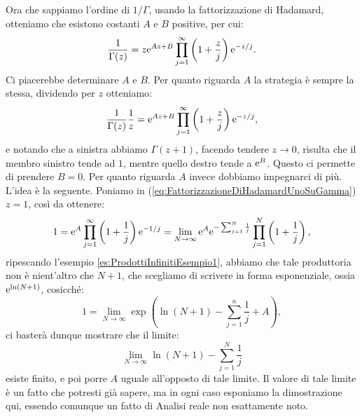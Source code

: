 \documentclass[11pt]{book}
\theoremstyle{Definizione}
\theoremstyle{TeoremaProposizioneLemmaCorollarioCongettura}
\theoremstyle{OsservazioneNotaEsempio}
\newcommand{\e}{\textup{e}}
\begin{document}
Ora che sappiamo l'ordine di $1/\Gamma$, usando la fattorizzazione di Hadamard, otteniamo che esistono costanti $A$ e $B$ positive, per cui:
\begin{equation}\label{eq:FattorizzazioneDiHadamardUnoSuGamma}
\frac{1}{\Gamma(z)} = z \e^{Az+B} \prod_{j = 1}^\infty \left(1+\frac{z}{j}\right)\e^{-z/j}.
\end{equation}
Ci piacerebbe determinare $A$ e $B$. Per quanto riguarda $A$ la strategia è sempre la stessa, dividendo per $z$ otteniamo:
$$
\frac{1}{\Gamma(z)}\frac{1}{z} = \e^{Az+B} \prod_{j = 1}^\infty \left(1+\frac{z}{j}\right)\e^{-z/j},
$$
e notando che a sinistra abbiamo $\Gamma(z+1)$, facendo tendere $z \to 0$, risulta che il membro sinistro tende ad $1$, mentre quello destro tende a $\e^{B}$. Questo ci permette di prendere $B = 0$. Per quanto riguarda $A$ invece dobbiamo impegnarci di più. L'idea è la seguente. Poniamo in (\ref{eq:FattorizzazioneDiHadamardUnoSuGamma}) $z = 1$, così da ottenere:
$$
1 = \e^{A} \prod_{j = 1}^\infty \left(1+\frac{1}{j}\right)\e^{-1/j}  = \lim_{N \to \infty} \e^{A} \e^{-\sum_{j = 1}^N \frac{1}{j}} \prod_{j = 1}^N \left(1+\frac{1}{j}\right),
$$
ripescando l'esempio \ref{es:ProdottiInfinitiEsempio1}, abbiamo che tale produttoria non è nient'altro che $N+1$, che scegliamo di scrivere in forma esponenziale, ossia $\e^{\ln(N+1)}$, cosicché:
$$
1 = \lim_{N \to \infty} \exp\left(\ln(N+1)-\sum_{j = 1}^n \frac{1}{j}+A\right),
$$
ci basterà dunque mostrare che il limite:
$$
\lim_{N \to \infty} \ln(N+1)-\sum_{j = 1}^N \frac{1}{j}
$$
esiste finito, e poi porre $A$ uguale all'opposto di tale limite. Il valore di tale limite è un fatto che potresti già sapere, ma in ogni caso esponiamo la dimostrazione qui, essendo comunque un fatto di Analisi reale non esattamente noto.
\end{document}
